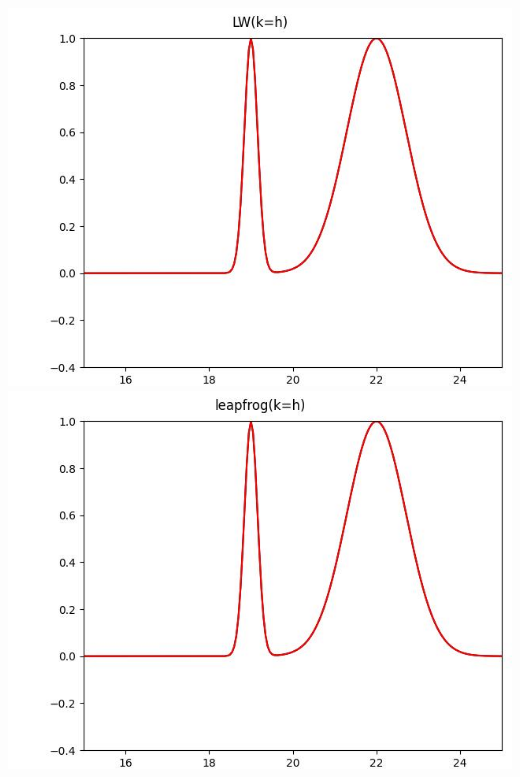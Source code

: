 \documentclass[12pt]{ctexart}
\begin{document}
\includegraphics[scale=0.52]{LW(k=h).jpg}
\includegraphics[scale=0.52]{leapfrog(k=h).jpg}
\end{document}
